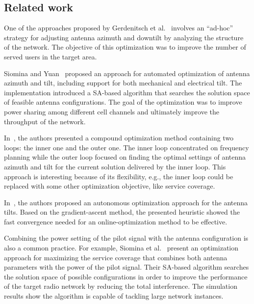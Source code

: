 \subsection{Related work}

One of the approaches proposed by Gerdenitsch et al.~\cite{Antenna.tilt.and.CPICH:2003}
involves an ``ad-hoc'' strategy for adjusting antenna azimuth and
downtilt by analyzing the structure of the network. The objective
of this optimization was to improve the number of served users in
the target area. 

Siomina and Yuan~\cite{Antenna.Configuration:2008} proposed an approach
for automated optimization of antenna azimuth and tilt, including
support for both mechanical and electrical tilt. The implementation
introduced a SA-based algorithm that searches the solution space of
feasible antenna configurations. The goal of the optimization was
to improve power sharing among different cell channels and ultimately
improve the throughput of the network.

In~\cite{Antenna.azimuth.tilt:2009}, the authors presented a compound
optimization method containing two loops: the inner one and the outer
one. The inner loop concentrated on frequency planning while the outer
loop focused on finding the optimal settings of antenna azimuth and
tilt for the current solution delivered by the inner loop. This approach
is interesting because of its flexibility, e.g., the inner loop could
be replaced with some other optimization objective, like service coverage.

In~\cite{Eckhardt-Vertical_antenna_tilt_optimization_for_LTE:2011},
the authors proposed an autonomous optimization approach for the antenna
tilts. Based on the gradient-ascent method, the presented heuristic
showed the fast convergence needed for an online-optimization method
to be effective. 

\bigskip{}


Combining the power setting of the pilot signal with the antenna configuration
is also a common practice. For example, Siomina et al.~\cite{Coverage.optimization.on.CPICH.tilt.and.azimuth:2006}
present an optimization approach for maximizing the service coverage
that combines both antenna parameters with the power of the pilot
signal. Their SA-based algorithm searches the solution space of possible
configurations in order to improve the performance of the target radio
network by reducing the total interference. The simulation results
show the algorithm is capable of tackling large network instances.

